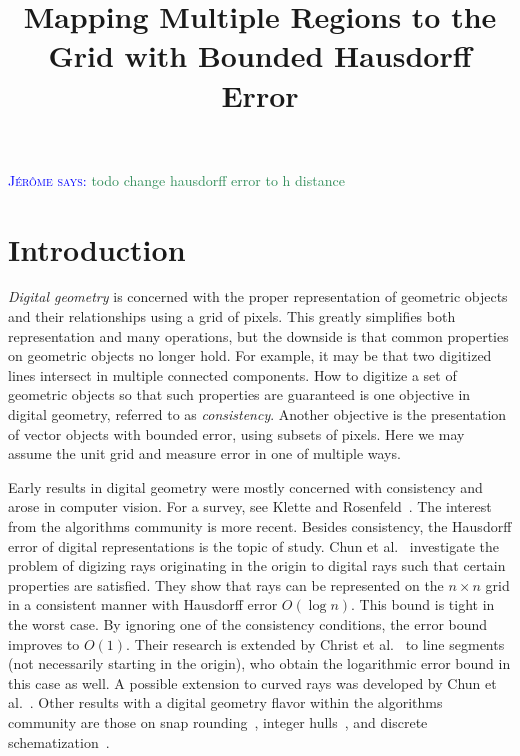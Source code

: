 \documentclass[a4paper, 11pt]{article}
\title{Mapping Multiple Regions to the Grid with Bounded Hausdorff Error}
\newcommand{\mremark}[3]{\textcolor{blue}{\textsc{#1 #2:}} \textcolor{SeaGreen}{\textsf{#3}}}
\newcommand{\jerome}[2][says]{\mremark{J\'er\^ome}{#1}{#2}}
\newcommand{\etal}{\textnormal{et al.}\xspace}
\begin{document}
\maketitle

\jerome{todo change hausdorff error to h distance}

\section{Introduction}

\emph{Digital geometry} is concerned with the proper representation of geometric objects and their relationships using a grid of pixels. This greatly
simplifies both representation and many operations, but the downside is that common properties on geometric objects no longer hold. For example, it may be that two digitized lines intersect in multiple connected components. How to digitize a set of geometric objects so that such properties are guaranteed is one objective in digital geometry, referred to as \emph{consistency}. Another objective is the presentation of vector objects with bounded error, using subsets of pixels. Here we may assume the unit grid and measure error in one of multiple ways.

Early results in digital geometry were mostly concerned with consistency and arose in computer vision. For a survey, see Klette and Rosenfeld~\cite{klette2004digitalgeometry,klette2004digital}.
The interest from the algorithms community is more recent. Besides consistency, the Hausdorff error of digital representations is the topic of study.
Chun \etal~\cite{chun2009consistent} investigate the problem of digizing rays originating in the origin to digital rays such that certain properties are satisfied. They show that rays can be represented on the $n\times n$ grid in a consistent manner with Hausdorff error $O(\log n)$. This bound is tight in the worst case. By ignoring one of the consistency conditions, the error bound improves to $O(1)$.
Their research is extended by Christ \etal~\cite{christ2012consistent} to line segments (not necessarily starting in the origin), who obtain
the logarithmic error bound in this case as well.
A possible extension to curved rays was developed by Chun \etal~\cite{chun2019consistent}.
Other results with a digital geometry flavor within the algorithms community are those on snap rounding~\cite{de2007intersection,guibas,hershberger}, integer hulls~\cite{Althaus04,Harvey99}, and discrete schematization~\cite{loffler2017discretized}.

\end{document}

